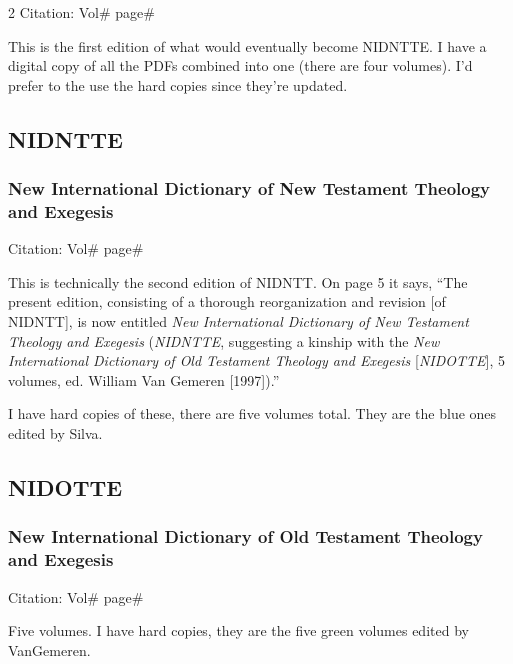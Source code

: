 \begin{multicols}{2}
			Citation:
				Vol\# page\#
		
			This is the first edition of what would eventually become NIDNTTE. I have a digital copy of all the PDFs combined into one (there are four volumes). I'd prefer to the use the hard copies since they're updated.
			
	\subsection*{NIDNTTE}
	
		\subsubsection*{New International Dictionary of New Testament Theology and Exegesis}
		
			Citation:
				Vol\# page\#
		
			This is technically the second edition of NIDNTT. On page 5 it says, ``The present edition, consisting of a thorough reorganization and revision [of NIDNTT], is now entitled \textit{New International Dictionary of New Testament Theology and Exegesis} (\textit{NIDNTTE}, suggesting a kinship with the \textit{New International Dictionary of Old Testament Theology and Exegesis} [\textit{NIDOTTE}], 5 volumes, ed. William Van Gemeren [1997]).''
			
			I have hard copies of these, there are five volumes total. They are the blue ones edited by Silva.
			
	\subsection*{NIDOTTE}
	
		\subsubsection*{New International Dictionary of Old Testament Theology and Exegesis}
		
			Citation:
				Vol\# page\#
		
			Five volumes. I have hard copies, they are the five green volumes edited by VanGemeren.
			

\end{multicols}
